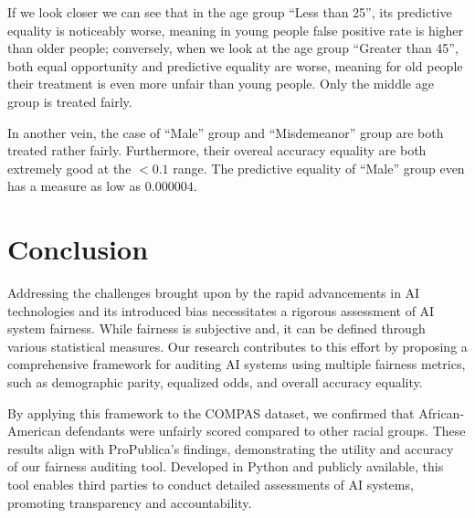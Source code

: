 \documentclass[conference]{IEEEtran}
\begin{document}
If we look closer we can see that in the age group ``Less than 25'', its predictive equality is noticeably worse, meaning in young people false positive rate is higher than older people; conversely, when we look at the age group ``Greater than 45'', both equal opportunity and predictive equality are worse, meaning for old people their treatment is even more unfair than young people. Only the middle age group is treated fairly.

In another vein, the case of ``Male'' group and ``Misdemeanor'' group are both treated rather fairly. Furthermore, their overeal accuracy equality are both extremely good at the $< 0.1$ range. The predictive equality  of ``Male'' group even has a measure as low as $0.000004$.

\section{Conclusion}
Addressing the challenges brought upon by the rapid advancements in AI technologies and its introduced bias necessitates a rigorous assessment of AI system fairness. While fairness is subjective and, it can be defined through various statistical measures. Our research contributes to this effort by proposing a comprehensive framework for auditing AI systems using multiple fairness metrics, such as demographic parity, equalized odds, and overall accuracy equality.

By applying this framework to the COMPAS dataset, we confirmed that African-American defendants were unfairly scored compared to other racial groups. These results align with ProPublica's findings, demonstrating the utility and accuracy of our fairness auditing tool. Developed in Python and publicly available, this tool enables third parties to conduct detailed assessments of AI systems, promoting transparency and accountability.
\end{document}
